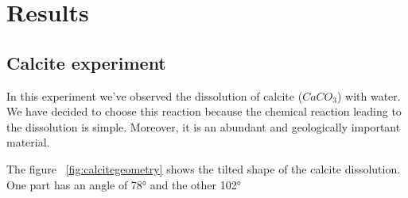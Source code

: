 \chapter{Results}


\section{Calcite experiment}

In this experiment we've observed the dissolution of calcite ($CaCO_3$) with water. We have decided to choose this reaction because the chemical reaction leading to the dissolution is simple. Moreover, it is an abundant and geologically important material.\cite{hillner1992atomic}\cite{liang1996dissolution} \cite{paquette1995relationship}

The figure ~\ref{fig:calcitegeometry} shows the tilted shape of the calcite dissolution. One part has an angle of 78° and the other 102°\cite{shiraki2000dissolution} \cite{Morse200251}

